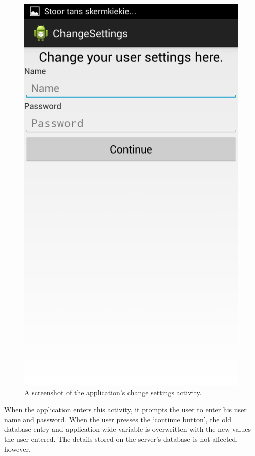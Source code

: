 \begin{figure}
 \centering 
 \includegraphics[clip = true, trim = 0 680 0 60,
 scale=0.2]{settings_screenshot}
 \caption{A screenshot of the application's change settings activity.}
 \label{fig:change-settings-screenshot}
\end{figure}

When the application enters this activity, it prompts the user to enter his user
name and password. When the user presses the `continue button', the old database
entry and application-wide variable is overwritten with the new values the user entered.
The details stored on the server's database is not affected, however.

